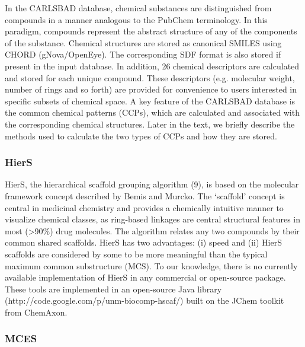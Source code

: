 In the CARLSBAD database, chemical substances are distinguished from compounds in a manner analogous to the PubChem terminology. In this paradigm, compounds represent the abstract structure of any of the components of the substance. Chemical structures are stored as canonical SMILES using CHORD (gNova/OpenEye). The corresponding SDF format is also stored if present in the input database. In addition, 26 chemical descriptors are calculated and stored for each unique compound. These descriptors (e.g. molecular weight, number of rings and so forth) are provided for convenience to users interested in specific subsets of chemical space. A key feature of the CARLSBAD database is the common chemical patterns (CCPs), which are calculated and associated with the corresponding chemical structures. Later in the text, we briefly describe the methods used to calculate the two types of CCPs and how they are stored.

\subsubsection{HierS}

HierS, the hierarchical scaffold grouping algorithm\cite{Wilkens2005-ja} (9), is based on the molecular framework concept described by Bemis and Murcko\cite{Bemis1996-jg}. The ‘scaffold’ concept is central in medicinal chemistry and provides a chemically intuitive manner to visualize chemical classes, as ring-based linkages are central structural features in most (\textgreater 90\%) drug molecules. The algorithm relates any two compounds by their common shared scaffolds. HierS has two advantages: (i) speed and (ii) HierS scaffolds are considered by some to be more meaningful than the typical maximum common substructure (MCS). To our knowledge, there is no currently available implementation of HierS in any commercial or open-source package. These tools are implemented in an open-source Java library (http://code.google.com/p/unm-biocomp-hscaf/) built on the JChem toolkit from ChemAxon.

\subsubsection{MCES}

